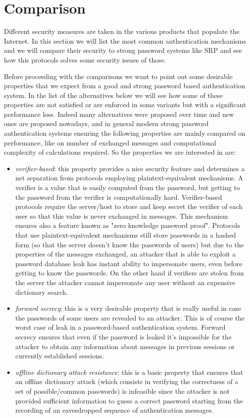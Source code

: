 \documentclass[11pt]{article}
\begin{document}
\section{Comparison}
Different security measures are taken in the various products that populate the Internet. In this section we will list the most common authentication mechanisms and we will compare their security  to strong password systems like SRP and see how this protocols solves some security issues of those.

Before proceeding with the comparisons we want to point out some desirable properties that we expect from a good and strong password based authentication system. In the list of the alternatives below we will see how some of these properties are not satisfied or are enforced in some variants but with a significant performance loss. Indeed many alternatives were proposed over time and new ones are proposed nowadays, and in general modern strong password authentication systems ensuring the following properties are mainly compared on performance, like on number of exchanged messages and computational complexity of calculations required. So the properties we are interested in are:
\begin{itemize}
	\item \emph{verifier-based}: this property provides a nice security feature and determines a net separation from protocols employing plaintext-equivalent mechanisms. A verifier is a value that is easily computed from the password, but getting to the password from the verifier is computationally hard. Verifier-based protocols require the server/host to store and keep secret the verifier of each user so that this value is never exchanged in messages. This mechanism ensures also a feature known as "zero knowledge password proof". Protocols that use plaintext-equivalent mechanisms still store passwords in a hashed form (so that the server doesn't know the passwords of users) but due to the properties of the messages exchanged, an attacker that is able to exploit a password database leak has instant ability to impersonate users, even before getting to know the passwords. On the other hand if verifiers are stolen from the server the attacker cannot impersonate any user without an expensive dictionary search.
	\item \emph{forward secrecy}: this is a very desirable property that is really useful in case the passwords of some users are revealed to an attacker. This is of course the worst case of leak in a password-based authentication system. Forward secrecy ensures that even if the password is leaked it's impossible for the attacker to obtain any information about messages in previous sessions or currently established sessions. 
	\item \emph{offline dictionary attack resistance}: this is a basic property that ensures that an offline dictionary attack (which consists in verifying the correctness of a set of possible/common passwords) is infeasible since the attacker is not provided sufficient information to guess a correct password starting from the recording of an eavesdropped sequence of authentication messages.
\end{itemize}
\end{document}
